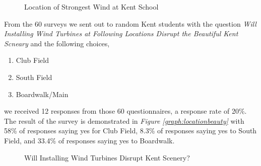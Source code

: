 \documentclass[review]{elsarticle}
\begin{document}
\clearpage

\begin{figure}
    \caption{Location of Strongest Wind at Kent School}
    \label{fig:locationpick}
\end{figure}

From the 60 surveys we sent out to random Kent students with the question \textit{Will Installing Wind Turbines at Following Locations Disrupt the Beautiful Kent Scneary} 
and the following choices,
\begin{enumerate}
    \item Club Field
    \item South Field
    \item Boardwalk/Main
\end{enumerate}

we received 12 responses from those 60 questionnaires, a response rate of 20\%. The result of the survey is demonstrated in \textit{Figure \ref{graph:locationbeauty}} with 58\% of responses saying yes 
for Club Field, 8.3\% of responses saying yes to South Field, and 33.4\% of responses saying yes to Boardwalk.\\

\begin{figure}[!h]
    \caption{Will Installing Wind Turbines Disrupt Kent Scenery?}
\end{figure}
\end{document}
